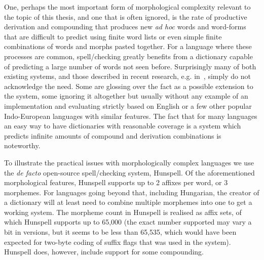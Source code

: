 \documentclass[officiallayout]{unihelcompling}
\begin{document}
One, perhaps the most important form of morphological complexity relevant to
the topic of this thesis, and one that is often ignored, is the rate of
productive derivation and compounding that produces new \emph{ad hoc} words and
word-forms that are difficult to predict using finite word lists or even simple
finite combinations of words and morphs pasted together.  For a language where
these processes are common, spell\-/checking greatly benefits from a dictionary
capable of predicting a large number of words not seen before. Surprisingly
many of both existing systems, and those described in recent research, e.g.
in~\cite{hassan2008language,watson2003new}, simply do not acknowledge the need.
Some are glossing over the fact as a possible extension to the system, some
ignoring it altogether but usually without any example of an implementation and
evaluating strictly based on English or a few other popular Indo-European
languages with similar features. The fact that for many languages an easy way
to have dictionaries with reasonable coverage is a system which predicts
infinite amounts of compound and derivation combinations is noteworthy.

To illustrate the practical issues with morphologically complex languages we
use the \emph{de facto} open-source spell\-/checking system, Hunspell. Of the
aforementioned morphological features, Hunspell supports up to 2 affixes per
word, or 3 morphemes. For languages going beyond that, including Hungarian, the
creator of a dictionary will at least need to combine multiple morphemes into
one to get a working system. The morpheme count in Hunspell is realised as
affix sets, of which Hunspell supports up to 65,000 (the exact number supported
may vary a bit in versions, but it seems to be less than 65,535, which would
have been expected for two-byte coding of suffix flags that was used in the
system). Hunspell does, however, include support for some compounding.
\end{document}

